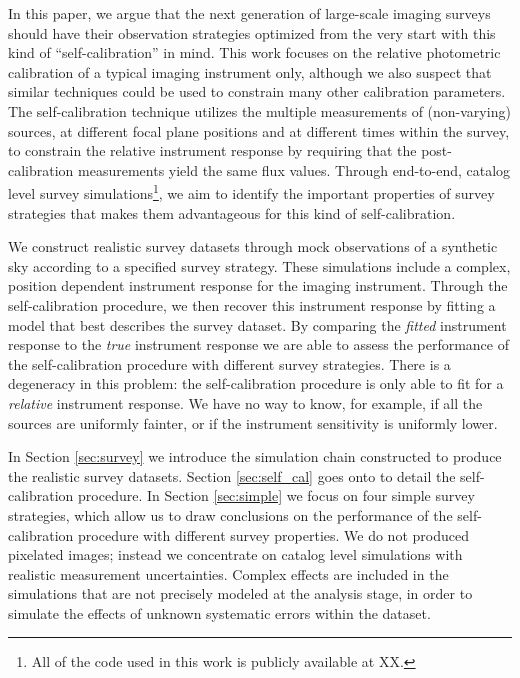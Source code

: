 \documentclass[manuscript]{aastex}
\begin{document}
In this paper, we argue that the next generation of large-scale imaging surveys should have their observation strategies optimized from the very start with this kind of ``self-calibration'' in mind. This work focuses on the relative photometric calibration of a typical imaging instrument only, although we also suspect that similar techniques could be used to constrain many other calibration parameters. The self-calibration technique utilizes the multiple measurements of (non-varying) sources, at different focal plane positions and at different times within the survey, to constrain the relative instrument response by requiring that the post-calibration measurements yield the same flux values. Through end-to-end, catalog level survey simulations\footnote{All of the code used in this work is publicly available at XX.}, we aim to identify the important properties of survey strategies that makes them advantageous for this kind of self-calibration. 

We construct realistic survey datasets through mock observations of a synthetic sky according to a specified survey strategy. These simulations include a complex, position dependent instrument response for the imaging instrument. Through the self-calibration procedure, we then recover this instrument response by fitting a model that best describes the survey dataset. By comparing the \textit{fitted} instrument response to the \textit{true} instrument response we are able to assess the performance of the self-calibration procedure with different survey strategies. There is a degeneracy in this problem: the self-calibration procedure is only able to fit for a \textit{relative} instrument response. We have no way to know, for example, if all the sources are uniformly fainter, or if the instrument sensitivity is uniformly lower. 

In Section \ref{sec:survey} we introduce the simulation chain constructed to produce the realistic survey datasets. Section \ref{sec:self_cal} goes onto to detail the self-calibration procedure. In Section \ref{sec:simple} we focus on four simple survey strategies, which allow us to draw conclusions on the performance of the self-calibration procedure with different survey properties. We do not produced pixelated images; instead we concentrate on catalog level simulations with realistic measurement uncertainties. Complex effects are included in the simulations that are not  precisely modeled at the analysis stage, in order to simulate the effects of unknown systematic errors within the dataset.
\end{document}
